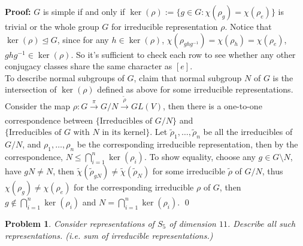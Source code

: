 \documentclass[12pt]{article}
\newtheorem{problem}{Problem}
\begin{document}
\textbf{Proof:} $G$ is simple if and only if $\ker(\rho):=\{g\in G: \chi(\rho_g)=\chi(\rho_e)\}$ is trivial or the whole group $G$ for irreducible representation $\rho$. Notice that $\ker(\rho)\trianglelefteq G$, since for any $h\in \ker(\rho)$, $\chi(\rho_{ghg^{-1}})=\chi(\rho_h)=\chi(\rho_e)$, $ghg^{-1}\in \ker(\rho)$. So it's sufficient to check each row to see whether any other conjugacy classes share the same character as $[e]$.\\
\indent To describe normal subgroups of $G$, claim that normal subgroup $N$ of $G$ is the intersection of $\ker(\rho)$ defined as above for some irreducible representations. Consider the map $\rho: G\xrightarrow[]{\pi} G/N\xrightarrow[]{\tilde{\rho}} GL(V)$, then there is a one-to-one correspondence between $\{\text{Irreducibles of }G/N\}$ and $\{\text{Irreducibles of }G\text{ with }N\text{ in its kernel}\}$. Let $\tilde{\rho}_1, \dots, \tilde{\rho}_n$ be all the irreducibles of $G/N$, and $\rho_1, \dots, \rho_n$ be the corresponding irreducible representation, then by the correspondence, $N\leq \bigcap_{i=1}^{n}\ker(\rho_i)$. To show equality, choose any $g\in G\setminus N$, have $gN\neq N$, then $\tilde{\chi}(\tilde{\rho}_{gN})\neq \tilde{\chi}(\tilde{\rho}_N)$ for some irreducible $\tilde{\rho}$ of $G/N$, thus $\chi(\rho_g)\neq\chi(\rho_e)$ for the corresponding irreducible $\rho$ of $G$, then $g\notin\bigcap_{i=1}^{n}\ker(\rho_i)$ and $N=\bigcap_{i=1}^{n}\ker(\rho_i)$. \qed
\\
\begin{problem}
Consider representations of $S_5$ of dimension $11$. Describe all such representations. (i.e. sum of irreducible representations.)
\end{problem}
\end{document}
